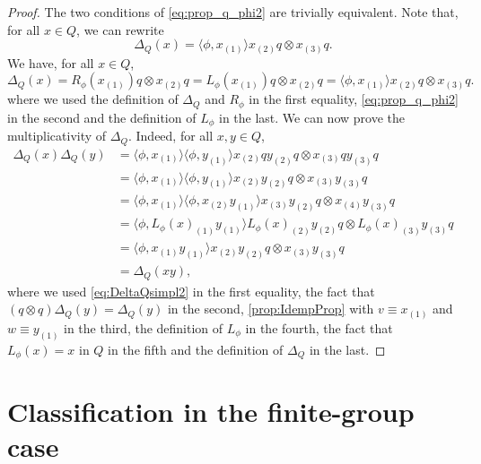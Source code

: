 \documentclass[a4paper,10pt]{amsart}
\newcommand{\eval}[2]{\langle #1 , #2\rangle}
\theoremstyle{definition}
\begin{document}
\begin{proof}
    The two conditions of \cref{eq:prop_q_phi2} are trivially equivalent.
    \smallbreak\noindent%
    Note that, for all $x\in Q$, we can rewrite
    \begin{equation}\label{eq:DeltaQsimpl2}
        \Delta_Q(x)
        =
        \eval{\phi}{x_{(1)}} x_{(2)}q \otimes x_{(3)} q.
    \end{equation}
    We have, for all $x\in Q$,
    \[
        \Delta_Q(x) 
        =
        R_\phi(x_{(1)})q \otimes x_{(2)}q
        =
        L_\phi(x_{(1)})q \otimes x_{(2)}q
        =
        \eval{\phi}{x_{(1)}} x_{(2)}q \otimes x_{(3)}q.
    \]
    where we used the definition of $\Delta_Q$ and $R_{\phi}$ in the first equality, \cref{eq:prop_q_phi2} in the second and the definition of $L_{\phi}$ in the last.
    We can now prove the multiplicativity of $\Delta_Q$. Indeed, for all $x, y \in Q$,
    \begin{align*}
        \Delta_{Q}(x) \Delta_{Q}(y)
        &=
            \eval{\phi}{x_{(1)}}
                \eval{\phi}{y_{(1)}}
                    x_{(2)}q y_{(2)}q \otimes x_{(3)} q y_{(3)}q
        \\
        &=
            \eval{\phi}{x_{(1)}}
                \eval{\phi}{y_{(1)}}
                    x_{(2)} y_{(2)}q \otimes x_{(3)} y_{(3)}q
        \\
        &=
            \eval{\phi}{x_{(1)}}
                \eval{\phi}{x_{(2)}y_{(1)}}
                    x_{(3)} y_{(2)}q \otimes x_{(4)} y_{(3)}q
        \\
        &=
        \eval{\phi}{L_{\phi}(x)_{(1)}y_{(1)}}
            L_{\phi}(x)_{(2)} y_{(2)}q \otimes L_{\phi}(x)_{(3)} y_{(3)}q
        \\
        &=
        \eval{\phi}{x_{(1)}y_{(1)}}
            x_{(2)} y_{(2)}q \otimes x_{(3)} y_{(3)}q
        \\
        &=
        \Delta_{Q}(xy),
    \end{align*}
    where we used \cref{eq:DeltaQsimpl2} in the first equality, the fact that $(q\otimes q)\Delta_Q(y)=\Delta_Q(y)$ in the second, \cref{prop:IdempProp} with $v\equiv x_{(1)}$ and $w\equiv y_{(1)}$ in the third, the definition of $L_{\phi}$ in the fourth, the fact that $L_{\phi}(x)=x$ in $Q$ in the fifth and the definition of $\Delta_{Q}$ in the last.
\end{proof}

\section{Classification in the finite-group case}
\label{sec:groups}
\end{document}
